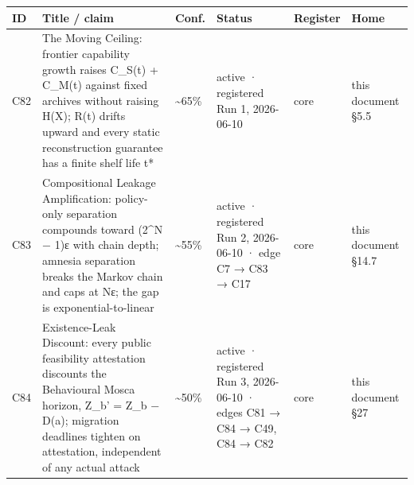 \documentclass[
]{article}
\newcounter{none} %
\begin{document}
{\def\LTcaptype{none} %
\begin{longtable}[]{@{}
  >{\raggedright\arraybackslash}p{}
  >{\raggedright\arraybackslash}p{}
  >{\raggedright\arraybackslash}p{}
  >{\raggedright\arraybackslash}p{}
  >{\raggedright\arraybackslash}p{}
  >{\raggedright\arraybackslash}p{}@{}}
\toprule\noalign{}
\begin{minipage}[b]{\linewidth}\raggedright
ID
\end{minipage} & \begin{minipage}[b]{\linewidth}\raggedright
Title / claim
\end{minipage} & \begin{minipage}[b]{\linewidth}\raggedright
Conf.
\end{minipage} & \begin{minipage}[b]{\linewidth}\raggedright
Status
\end{minipage} & \begin{minipage}[b]{\linewidth}\raggedright
Register
\end{minipage} & \begin{minipage}[b]{\linewidth}\raggedright
Home
\end{minipage} \\
\midrule\noalign{}
\endhead
\bottomrule\noalign{}
\endlastfoot
C82 & The Moving Ceiling: frontier capability growth raises C\_S(t) +
C\_M(t) against fixed archives without raising H(X); R(t) drifts upward
and every static reconstruction guarantee has a finite shelf life t* &
\textasciitilde65\% & active · registered Run 1, 2026-06-10 & core &
this document §5.5 \\
C83 & Compositional Leakage Amplification: policy-only separation
compounds toward (2\^{}N − 1)ε with chain depth; amnesia separation
breaks the Markov chain and caps at Nε; the gap is exponential-to-linear
& \textasciitilde55\% & active · registered Run 2, 2026-06-10 · edge C7
→ C83 → C17 & core & this document §14.7 \\
C84 & Existence-Leak Discount: every public feasibility attestation
discounts the Behavioural Mosca horizon, Z\_b' = Z\_b − D(a); migration
deadlines tighten on attestation, independent of any actual attack &
\textasciitilde50\% & active · registered Run 3, 2026-06-10 · edges C81
→ C84 → C49, C84 → C82 & core & this document §27 \\

\end{longtable}}
\end{document}
